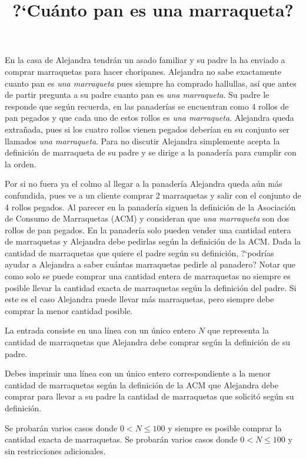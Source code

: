 \documentclass{oci}
\title{?`Cuánto pan es una marraqueta?}
\begin{document}
\begin{problemDescription}
En la casa de Alejandra tendrán un asado familiar y su padre la ha enviado a comprar marraquetas para hacer choripanes.
Alejandra no sabe exactamente cuanto pan es \textit{una marraqueta} pues siempre ha comprado hallullas, así que antes de partir pregunta a su padre cuanto pan es \textit{una marraqueta}.
Su padre le responde que según recuerda, en las panaderías se encuentran como 4 rollos de pan pegados y que cada uno de estos rollos es \textit{una marraqueta}.
Alejandra queda extrañada, pues si los cuatro rollos vienen pegados deberían en su conjunto ser llamados \textit{una marraqueta}.
Para no discutir Alejandra simplemente acepta la definición de marraqueta de su padre y se dirige a la panadería para cumplir con la orden.

Por si no fuera ya el colmo al llegar a la panadería Alejandra queda aún más confundida, pues ve a un cliente comprar 2 marraquetas y salir con el conjunto de 4 rollos pegados.
Al parecer en la panadería siguen la definición de la Asociación de Consumo de Marraquetas (ACM) y consideran que \textit{una marraqueta} son dos rollos de pan pegados. 
En la panadería solo pueden vender una cantidad entera de marraquetas y Alejandra debe pedirlas según la definición de la ACM\@.
Dada la cantidad de marraquetas que quiere el padre según su definición, ?`podrías ayudar a Alejandra a saber cuántas marraquetas pedirle al panadero?
Notar que como solo se puede comprar una cantidad entera de marraquetas no siempre es posible llevar la cantidad exacta de marraquetas según la definición del padre.
Si este es el caso Alejandra puede llevar más marraquetas, pero siempre debe comprar la menor cantidad posible.

\end{problemDescription}

\begin{inputDescription}
La entrada consiste en una línea con un único entero $N$ que representa la cantidad de marraquetas que Alejandra debe comprar según la definición de su padre.
\end{inputDescription}

\begin{outputDescription}
Debes imprimir una línea con un único entero correspondiente a la menor cantidad de marraquetas según la definición de la ACM que Alejandra debe comprar para llevar a su padre la cantidad de marraquetas que solicitó según su definición.
\end{outputDescription}

\begin{scoreDescription}
   Se probarán varios casos donde $0<N\leq 100$ y siempre es posible comprar la cantidad exacta de marraquetas. 
   Se probarán varios casos donde $0<N\leq 100$ y sin restricciones adicionales.
\end{scoreDescription}

\begin{sampleDescription}
\end{sampleDescription}
\end{document}
